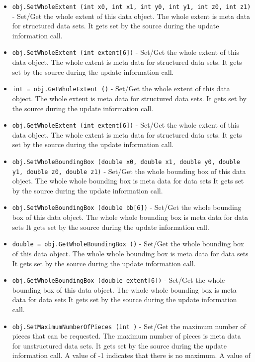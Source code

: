 \begin{itemize}
\item  \verb|obj.SetWholeExtent (int x0, int x1, int y0, int y1, int z0, int z1)| -  Set/Get the whole extent of this data object.  
 The whole extent is meta data for structured data sets.
 It gets set by the source during the update information call.

\item  \verb|obj.SetWholeExtent (int extent[6])| -  Set/Get the whole extent of this data object.  
 The whole extent is meta data for structured data sets.
 It gets set by the source during the update information call.

\item  \verb|int = obj.GetWholeExtent ()| -  Set/Get the whole extent of this data object.  
 The whole extent is meta data for structured data sets.
 It gets set by the source during the update information call.

\item  \verb|obj.GetWholeExtent (int extent[6])| -  Set/Get the whole extent of this data object.  
 The whole extent is meta data for structured data sets.
 It gets set by the source during the update information call.

\item  \verb|obj.SetWholeBoundingBox (double x0, double x1, double y0, double y1, double z0, double z1)| -  Set/Get the whole bounding box of this data object.  
 The whole whole bounding box is meta data for data sets
 It gets set by the source during the update information call.

\item  \verb|obj.SetWholeBoundingBox (double bb[6])| -  Set/Get the whole bounding box of this data object.  
 The whole whole bounding box is meta data for data sets
 It gets set by the source during the update information call.

\item  \verb|double = obj.GetWholeBoundingBox ()| -  Set/Get the whole bounding box of this data object.  
 The whole whole bounding box is meta data for data sets
 It gets set by the source during the update information call.

\item  \verb|obj.GetWholeBoundingBox (double extent[6])| -  Set/Get the whole bounding box of this data object.  
 The whole whole bounding box is meta data for data sets
 It gets set by the source during the update information call.

\item  \verb|obj.SetMaximumNumberOfPieces (int )| -  Set/Get the maximum number of pieces that can be requested.  
 The maximum number of pieces is meta data for unstructured data sets.
 It gets set by the source during the update information call.
 A value of -1 indicates that there is no maximum.  A value of


\end{itemize}
